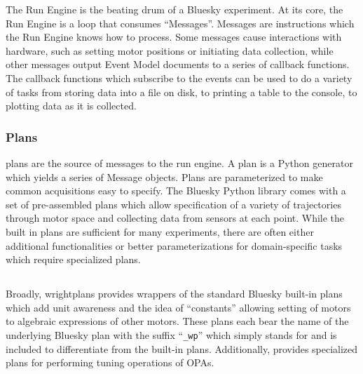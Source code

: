 The Run Engine is the beating drum of a Bluesky experiment.
At its core, the Run Engine is a loop that consumes ``Messages''.
Messages are instructions which the Run Engine knows how to process.
Some messages cause interactions with hardware, such as setting motor positions or initiating data collection, while other messages output Event Model documents to a series of callback functions.
The callback functions which subscribe to the events can be used to do a variety of tasks from storing data into a file on disk, to printing a table to the console, to plotting data as it is collected.

\subsubsection{Plans}


\Glspl{plan} are the source of messages to the run engine.
A plan is a Python generator which yields a series of Message objects.
Plans are parameterized to make common acquisitions easy to specify.
The Bluesky Python library comes with a set of pre-assembled plans which allow specification of a variety of trajectories through motor space and collecting data from sensors at each point.
While the built in plans are sufficient for many experiments, there are often either additional functionalities or better parameterizations for domain-specific tasks which require specialized plans.

\subsection{\wrightplans}


Broadly, \gls{wrightplans} provides wrappers of the standard Bluesky built-in plans which add unit awareness and the idea of ``constants'' allowing setting of motors to algebraic expressions of other motors.
These plans each bear the name of the underlying Bluesky plan with the suffix ``\texttt{\_wp}'' which simply stands for \wrightplans and is included to differentiate from the built-in plans.
Additionally, \wrightplans provides specialized plans for performing tuning operations of OPAs.

